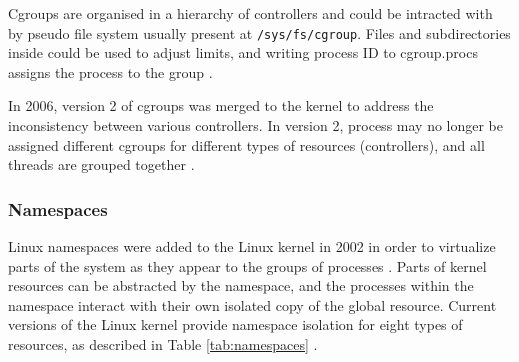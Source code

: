 Cgroups are organised in a hierarchy of controllers and could be intracted with by pseudo file system usually present at \texttt{/sys/fs/cgroup}. Files and subdirectories inside could be used to adjust limits, and writing process ID to cgroup.procs assigns the process to the group \cite{b:rice}.

In 2006, version 2 of cgroups was merged to the kernel to address the inconsistency between various controllers. In version 2, process may no longer be assigned different cgroups for different types of resources (controllers), and all threads are grouped together \cite{m:cgroups}.

\subsubsection{Namespaces}

Linux namespaces were added to the Linux kernel in 2002 in order to virtualize parts of the system as they appear to the groups of processes \cite{m:namespaces}. Parts of kernel resources can be abstracted by the namespace, and the processes within the namespace interact with their own isolated copy of the global resource. Current versions of the Linux kernel provide namespace isolation for eight types of resources, as described in Table \ref{tab:namespaces} \cite{s:namespaces}.


